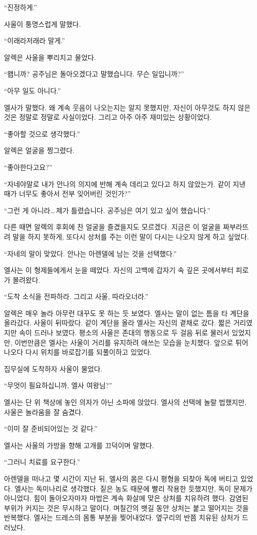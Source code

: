 ``진정하게.''

사울이 퉁명스럽게 말했다.

``이래라저래라 말게.''

알렉은 사울을 뿌리치고 물었다.

``왭니까? 공주님은 돌아오겠다고 말했습니다. 무슨 일입니까?''

``아무 일도 아니다.''

엘사가 말했다. 왜 계속 웃음이 나오는지는 알지 못했지만, 자신이 아무것도 하지 않은 것은 정말로 정말로 사실이었다. 그리고 아주 아주 재미있는 상황이었다.

``좋아할 것으로 생각했다.''

알렉은 얼굴을 찡그렸다.

``좋아한다고요?''

``자네야말로 내가 안나의 의지에 반해 계속 데리고 있다고 하지 않았는가. 같이 지낸 때가 너무도 좋아서 전부 잊어버린 것인가?''

``그런 게 아니라\ldots\,제가 틀렸습니다. 공주님은 여기 있고 싶어 했습니다.''

다른 때면 알렉의 후회에 찬 얼굴을 즐겼을지도 모르겠다. 지금은 이 얼굴을 짜부라뜨려 말을 하지 못하게, 또다시 상처를 주는 이런 말이 다시는 나오지 않게 하고 싶었다.

``자네의 말이 맞았다. 안나는 아렌델에 남는 것을 선택했다.''

엘사는 이 형제들에게서 눈을 떼었다. 자신의 고백에 갑자기 속 깊은 곳에서부터 피로가 몰려왔다.

``도착 소식을 전파하라. 그리고 사울, 따라오너라.''

알렉은 매우 놀라 아무런 대꾸도 못 하는 듯 보였다. 엘사는 말이 없는 틈을 타 계단을 올라갔다. 사울이 뒤따랐다. 같이 계단을 올라 엘사는 자신의 곁채로 갔다. 짧은 거리였지만 속이 드러나 보였다. 평소의 사울은 존대의 행동으로 두 걸음 뒤로 물러서 있었지만, 이번만큼은 엘사는 사울이 거리를 유지하려 애쓰는 모습을 눈치챘다. 앞으로 튀어나오다 다시 위치를 바로잡기를 되풀이하고 있었다.

집무실에 도착하자 사울이 물었다.

``무엇이 필요하십니까, 엘사 여왕님?''

엘사는 단 위 책상에 놓인 의자가 아닌 소파에 앉았다. 엘사의 선택에 놀랄 법했지만, 사울은 놀라움을 잘 숨겼다.

``이미 잘 준비되어있는 것 같다.''

엘사는 사울의 가방을 향해 고개를 끄덕이며 말했다.

``그러니 치료를 요구한다.''

아렌델을 떠나고 몇 시간이 지난 뒤, 엘사의 몸은 다시 평형을 되찾아 독에 버티고 있었다. 엘사는 독미나리로 생각했다. 짙은 농도 때문에 빨리 작용한 듯했지만, 독이 문제가 아니었다. 힘이 돌아오자마자 마법은 계속 화살에 맞은 상처를 치유하려 했다. 감염된 부위가 커지는 것은 무시하고 말이다. 며칠간의 뱃길 동안 상처는 붙고 떨어지는 것을 반복했다. 엘사는 드레스의 몸통 부분을 찢어내었다. 옆구리의 반쯤 치유된 상처가 드러났다.

